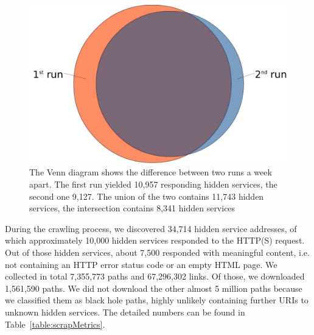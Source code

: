 \iflncs
  \begin{figure}
    \begin{center}
      \includegraphics[trim={0 0 0 7cm},width=\linewidth]{images/DarknetVolatilityAnnotated.png}
    \end{center}
    \caption{The Venn diagram shows the difference between two runs a week apart. The first run yielded 10,957 responding hidden services, the second one 9,127. The union of the two contains 11,743 hidden services, the intersection contains 8,341 hidden services}
    \label{fig:highVolatility}
  \end{figure}
\fi
During the crawling process, we discovered 34,714 hidden service addresses, of which approximately 10,000 hidden services responded to the HTTP(S) request. Out of those hidden services, about 7,500 responded with meaningful content, i.e. not containing an HTTP error status code or an empty HTML page.
We collected in total 7,355,773 paths and 67,296,302 links. Of those, we downloaded 1,561,590 paths. We did not download the other almost 5 million paths because we classified them as black hole paths, highly unlikely containing further URIs to unknown hidden services. The detailed numbers can be found in Table~\ref{table:scrapMetrics}.

